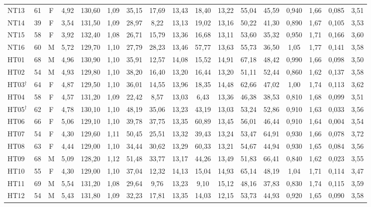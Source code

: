 \begin{table}[H]
{\begin{tabular}{lcccccccccccccccc}
NT13 & 61 & F & 4,92 & 130,60 & 1,09 & 35,15 & 17,69 & 13,43 & 18,40 & 13,22 & 55,04 & 45,59 & 0,940 & 1,66 & 0,085 & 3,51\\
NT14 & 39 & F & 3,54 & 131,50 & 1,09 & 28,97 & 8,22 & 13,13 & 19,02 & 13,16 & 50,22 & 41,30 & 0,890 & 1,67 & 0,105 & 3,53\\
NT15 & 58 & F & 3,92 & 132,40 & 1,08 & 26,71 & 15,79 & 13,36 & 16,68 & 13,11 & 53,60 & 35,32 & 0,950 & 1,71 & 0,166 & 3,60\\
NT16 & 60 & M & 5,72 & 129,70 & 1,10 & 27,79 & 28,23 & 13,46 & 57,77 & 13,63 & 55,73 & 36,50 & 1,05 & 1,77 & 0,141 & 3,58\\
HT01 & 68 & M & 4,96 & 130,90 & 1,10 & 35,91 & 12,57 & 14,08 & 15,52 & 14,91 & 67,18 & 48,42 & 0,990 & 1,66 & 0,098 & 3,50\\
HT02 & 54 & M & 4,93 & 129,80 & 1,10 & 38,20 & 16,40 & 13,20 & 16,44 & 13,20 & 51,11 & 52,44 & 0,860 & 1,62 & 0,137 & 3,58\\
HT03$^\dagger$ & 64 & F & 4,87 & 129,50 & 1,10 & 36,01 & 14,55 & 13,96 & 18,35 & 14,48 & 62,66 & 47,02 & 1,00 & 1,74 & 0,113 & 3,62\\
HT04 & 58 & F & 4,57 & 131,20 & 1,09 & 22,42 & 8,57 & 13,03 & 6,43 & 13,36 & 46,38 & 38,53 & 0,810 & 1,68 & 0,099 & 3,51\\
HT05$^\dagger$ & 62 & F & 4,78 & 130,10 & 1,10 & 48,19 & 35,06 & 13,23 & 43,19 & 13,03 & 53,24 & 52,86 & 0,910 & 1,63 & 0,033 & 3,56\\
HT06 & 66 & F & 5,06 & 129,10 & 1,10 & 39,78 & 37,75 & 13,35 & 60,89 & 13,45 & 56,01 & 46,44 & 0,910 & 1,64 & 0,004 & 3,54\\
HT07 & 54 & F & 4,30 & 129,60 & 1,11 & 50,45 & 25,51 & 13,32 & 39,43 & 13,24 & 53,47 & 64,91 & 0,930 & 1,66 & 0,078 & 3,72\\
HT08 & 63 & F & 4,44 & 129,00 & 1,10 & 34,44 & 30,62 & 13,29 & 60,33 & 13,21 & 54,67 & 44,94 & 0,930 & 1,65 & 0,084 & 3,56\\
HT09 & 68 & M & 5,09 & 128,20 & 1,12 & 51,48 & 33,77 & 13,17 & 44,26 & 13,49 & 51,83 & 66,41 & 0,840 & 1,62 & 0,023 & 3,55\\
HT10 & 55 & F & 4,30 & 129,00 & 1,10 & 37,04 & 12,32 & 14,13 & 15,04 & 14,93 & 65,14 & 48,19 & 1,04 & 1,71 & 0,114 & 3,47\\
HT11 & 69 & M & 5,54 & 131,20 & 1,08 & 29,64 & 9,76 & 13,23 & 9,10 & 15,12 & 48,16 & 37,83 & 0,830 & 1,74 & 0,115 & 3,59\\
HT12 & 54 & M & 5,43 & 131,80 & 1,09 & 32,23 & 17,81 & 13,35 & 14,03 & 12,15 & 53,73 & 44,93 & 0,920 & 1,65 & 0,090 & 3,58\\

\end{tabular}}
\end{table}
